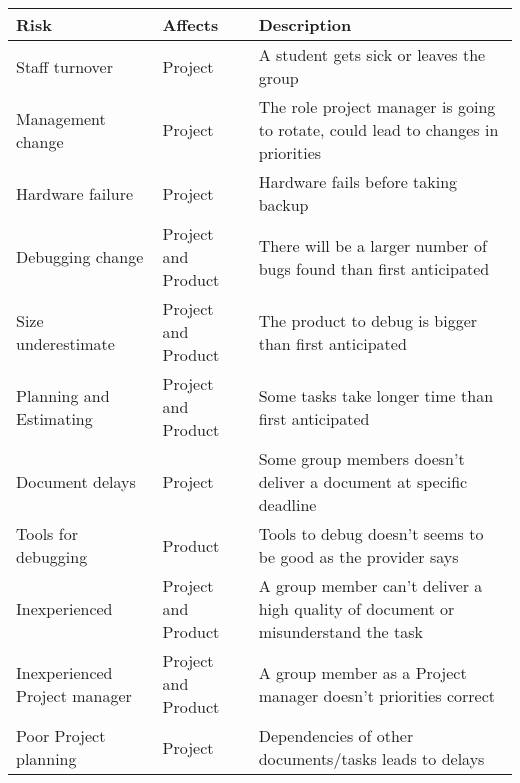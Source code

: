 \begin{center}
	\def\arraystretch{1.5}%
    \begin{tabular}{ | p{3cm} | p{2cm} | p{5cm} |}
    \hline
    \textbf{Risk} & \textbf{Affects} & \textbf{Description} \\ \hline
   	
		Staff turnover & Project & A student gets sick or leaves the group \\ \hline
		
		Management change & Project & The role project manager is going to rotate, could lead to changes in priorities \\ \hline
		
		Hardware failure & Project & Hardware fails before taking backup \\ \hline
		
		Debugging change & Project and Product & There will be a larger number of bugs found than first anticipated \\ \hline
		
		Size underestimate & Project and Product & The product to debug is bigger than first anticipated \\ \hline
		
		Planning and Estimating & Project and Product & Some tasks take longer time than first anticipated \\ \hline
		
		Document delays & Project & Some group members doesn’t deliver a document at specific deadline \\ \hline
		
		Tools for debugging & Product & Tools to debug doesn’t seems to be good as the provider says \\ \hline
		
		Inexperienced & Project and Product & A group member can’t deliver a high quality of document or misunderstand the task \\ \hline
		
		Inexperienced Project manager & Project and Product & A group member as a Project manager doesn’t priorities correct \\ \hline
		
		Poor Project planning & Project & Dependencies of other documents/tasks leads to delays \\
		
    \hline
    \end{tabular}
\end{center}